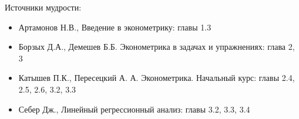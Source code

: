 \documentclass[russian,ignorenonframetext,]{beamer}
\begin{document}
\begin{frame}{Источники мудрости:}

\begin{itemize}
\item
  Артамонов Н.В., Введение в эконометрику: главы 1.3
\item
  Борзых Д.А., Демешев Б.Б. Эконометрика в задачах и упражнениях: глава
  2, 3
\item
  Катышев П.К., Пересецкий А. А. Эконометрика. Начальный курс: главы
  2.4, 2.5, 2.6, 3.2, 3.3
\item
  Себер Дж., Линейный регрессионный анализ: главы 3.2, 3.3, 3.4
\end{itemize}

\end{frame}
\end{document}
